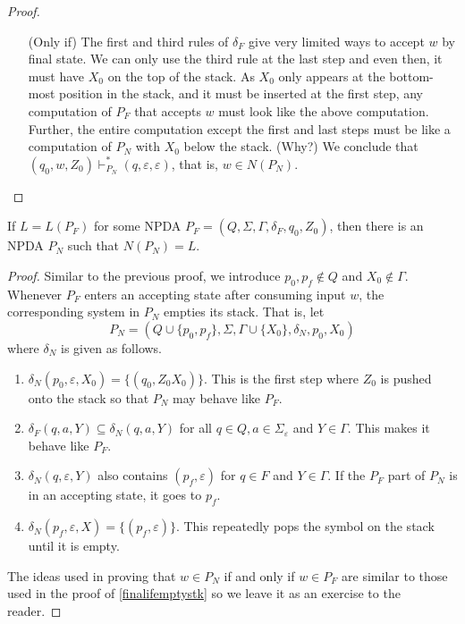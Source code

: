 \begin{proof}
\begin{itemize}
    \item[(Only if)] The first and third rules of $\delta_F$ give very limited ways to accept $w$ by final state. We can only use the third rule at the last step and even then, it must have $X_0$ on the top of the stack. As $X_0$ only appears at the bottom-most position in the stack, and it must be inserted at the first step, any computation of $P_F$ that accepts $w$ must look like the above computation. Further, the entire computation except the first and last steps must be like a computation of $P_N$ with $X_0$ below the stack. (Why?) We conclude that $(q_0,w,Z_0)\vdash^*_{P_N}(q,\varepsilon,\varepsilon)$, that is, $w\in N(P_N)$.  
\end{itemize}
\end{proof}

\begin{lemma}
\label{emptyiffinal}
    If $L=L(P_F)$ for some NPDA $P_F=(Q,\Sigma,\Gamma,\delta_F,q_0,Z_0)$, then there is an NPDA $P_N$ such that $N(P_N)=L$.
\end{lemma}
\begin{proof}
Similar to the previous proof, we introduce $p_0,p_f\not\in Q$ and $X_0\not\in\Gamma$. Whenever $P_F$ enters an accepting state after consuming input $w$, the corresponding system in $P_N$ empties its stack. That is, let
$$P_N=(Q\cup\{p_0,p_f\}, \Sigma, \Gamma\cup\{X_0\}, \delta_N, p_0, X_0)$$
where $\delta_N$ is given as follows.
\begin{enumerate}
    \item $\delta_N(p_0,\varepsilon,X_0)=\{(q_0,Z_0X_0)\}$. This is the first step where $Z_0$ is pushed onto the stack so that $P_N$ may behave like $P_F$.
    \item $\delta_F(q,a,Y)\subseteq\delta_N(q,a,Y)$ for all $q\in Q, a\in\Sigma_\varepsilon$ and $Y\in\Gamma$. This makes it behave like $P_F$.
    \item $\delta_N(q,\varepsilon,Y)$ also contains $(p_f,\varepsilon)$ for $q\in F$ and $Y\in\Gamma$. If the $P_F$ part of $P_N$ is in an accepting state, it goes to $p_f$.
    \item $\delta_N(p_f,\varepsilon,X)=\{(p_f,\varepsilon)\}$. This repeatedly pops the symbol on the stack until it is empty.
\end{enumerate}

    The ideas used in proving that $w\in P_N$ if and only if $w\in P_F$ are similar to those used in the proof of \ref{finalifemptystk} so we leave it as an exercise to the reader.
\end{proof}

